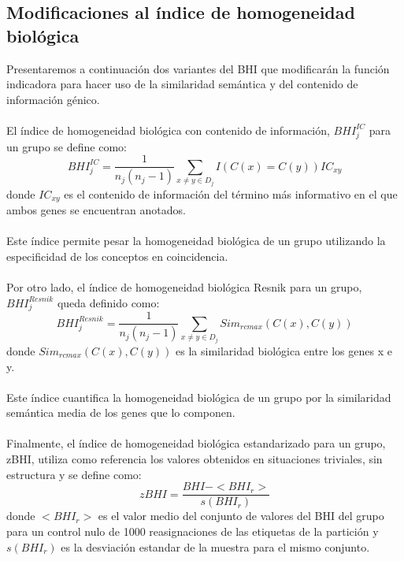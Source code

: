 \subsection{Modificaciones al índice de homogeneidad biológica}
\label{subsec:control_nulo}
Presentaremos a continuación dos variantes del BHI que modificarán la función indicadora para hacer uso de la similaridad semántica y del contenido de información génico.\\\\
El índice de homogeneidad biológica con contenido de información, $BHI_j^{IC}$ para un grupo se define como:
\begin{equation}
	BHI_j^{IC} = \frac{1}{n_j(n_j-1)}\sum\limits_{x\neq y\in D_j}I(C(x)=C(y))IC_{xy}
\end{equation}
donde $IC_{xy}$ es el contenido de información del término más informativo en el que ambos genes se encuentran anotados.\\\\
Este índice permite pesar la homogeneidad biológica de un grupo utilizando la especificidad de los conceptos en coincidencia.\\\\
Por otro lado, el índice de homogeneidad biológica Resnik para un grupo, $BHI_j^{Resnik}$ queda definido como:
\begin{equation}
	BHI_j^{Resnik} = \frac{1}{n_j(n_j-1)}\sum\limits_{x\neq y\in D_j}Sim_{rcmax}(C(x), C(y))
\end{equation}
donde $Sim_{rcmax}(C(x), C(y))$ es la similaridad biológica entre los genes x e y.\\\\
Este índice cuantifica la homogeneidad biológica de un grupo por la similaridad semántica media de los genes que lo componen.\\\\
Finalmente, el índice de homogeneidad biológica estandarizado para un grupo, zBHI, utiliza como referencia los valores obtenidos en situaciones triviales, sin estructura y se define como:
\begin{equation}
	zBHI = \frac{BHI-<BHI_r>}{s(BHI_r)}
\end{equation}
donde $<BHI_r>$ es el valor medio del conjunto de valores del BHI del grupo para un control nulo de 1000 reasignaciones de las etiquetas de la partición y $s(BHI_r)$ es la desviación estandar de la muestra para el mismo conjunto.\\\\
